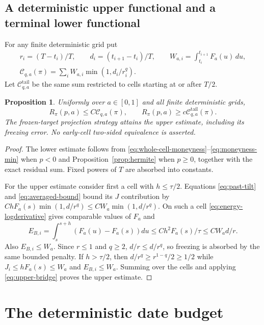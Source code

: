 \documentclass[11pt,a4paper]{amsart}
\theoremstyle{plain}
\newtheorem{proposition}[theorem]{Proposition}
\theoremstyle{definition}
\theoremstyle{remark}
\newcommand{\tail}{\mathrm{tail}}
\begin{document}
\subsection{A deterministic upper functional and a terminal lower functional}
For any finite deterministic grid put
\begin{equation}\label{eq:functional}
 \begin{gathered}
 r_i=(T-t_i)/T,\qquad d_i=(t_{i+1}-t_i)/T,\qquad
 W_{a,i}=\int_{t_i}^{t_{i+1}}F_a(u)\,du,\\
 \mathcal C_{q,a}(\pi)=\sum_i W_{a,i}\min(1,d_i/r_i^q).
 \end{gathered}
\end{equation}
Let $\mathcal C_{q,a}^{\tail}$ be the same sum restricted to cells starting at or after $T/2$.

\begin{proposition}\label{prop:functional}
Uniformly over $a\in[0,1]$ and all finite deterministic grids,
\begin{equation}\label{eq:functional-comparison}
 R_\pi(p,a)\le C\mathcal C_{q,a}(\pi),\qquad
 R_\pi(p,a)\ge c\mathcal C_{q,a}^{\tail}(\pi).
\end{equation}
The frozen-target projection strategy attains the upper estimate, including its freezing error. No early-cell two-sided equivalence is asserted.
\end{proposition}
\begin{proof}
The lower estimate follows from \eqref{eq:whole-cell-moneyness}--\eqref{eq:moneyness-min} when $p<0$ and Proposition~\ref{prop:hermite} when $p\ge0$, together with the exact residual sum. Fixed powers of $T$ are absorbed into constants.

For the upper estimate consider first a cell with $h\le\tau/2$. Equations \eqref{eq:past-tilt} and \eqref{eq:averaged-bound} bound its $J$ contribution by
$C hF_a(s)\min(1,d/r^q)\le C W_a\min(1,d/r^q)$. On such a cell \eqref{eq:energy-logderivative} gives comparable values of $F_a$ and
\[
 E_{B,i}=\int_s^{s+h}(F_a(u)-F_a(s))du
 \le C h^2F_a(s)/\tau\le C W_a d/r.
\]
Also $E_{B,i}\le W_a$. Since $r\le1$ and $q\ge2$, $d/r\le d/r^q$, so freezing is absorbed by the same bounded penalty. If $h>\tau/2$, then $d/r^q\ge r^{1-q}/2\ge1/2$ while $J_i\le hF_a(s)\le W_a$ and $E_{B,i}\le W_a$. Summing over the cells and applying \eqref{eq:upper-bridge} proves the upper estimate.
\end{proof}

\section{The deterministic date budget}\label{sec:dates}
\end{document}
